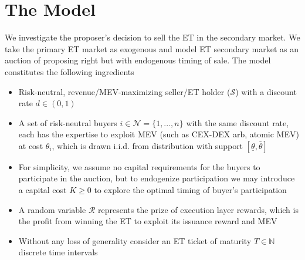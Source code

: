 \documentclass[a4paper,11pt]{article}
\begin{document}
\section{The Model}
We investigate the proposer's decision to sell the ET in the secondary market. We take the primary ET market as exogenous and model ET secondary market as an auction of proposing right but with endogenous timing of sale. The model constitutes the following ingredients
\begin{itemize}
    \item Risk-neutral, revenue/MEV-maximizing seller/ET holder (\(\mathcal{S}\)) with a discount rate \(d\in(0,1)\) 
    \item A set of risk-neutral buyers \(i\in \mathcal{N}=\{1,...,n\}\) with the same discount rate, each has the expertise to exploit MEV (such as CEX-DEX arb, atomic MEV) at cost \(\theta_i\), which is drawn i.i.d. from distribution with support \([\underline{\theta}, \bar{\theta}]\)
    \item For simplicity, we assume no capital requirements for the buyers to participate in the auction, but to endogenize participation we may introduce a capital cost \(K\geq 0\) to explore the optimal timing of buyer's participation 
    \item A random variable \(\mathcal{R}\) represents the prize of execution layer rewards, which is the profit from winning the ET to exploit its issuance reward and MEV
    \item Without any loss of generality consider an ET ticket of maturity \(T\in\mathbb{N}\) discrete time intervals
\end{itemize}
\end{document}
